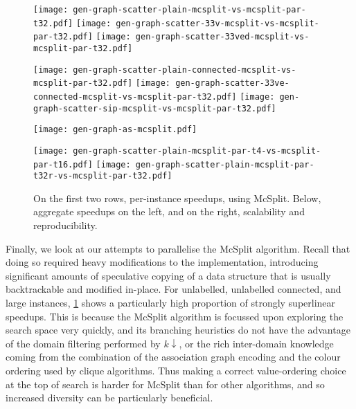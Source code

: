 \documentclass{llncs}
\begin{document}
\begin{figure}[p]
    \texttt{[image: gen-graph-scatter-plain-mcsplit-vs-mcsplit-par-t32.pdf]}
    \hfill
    \texttt{[image: gen-graph-scatter-33v-mcsplit-vs-mcsplit-par-t32.pdf]}
    \hfill
    \texttt{[image: gen-graph-scatter-33ved-mcsplit-vs-mcsplit-par-t32.pdf]}

    \vspace*{0.2em}

    \texttt{[image: gen-graph-scatter-plain-connected-mcsplit-vs-mcsplit-par-t32.pdf]}
    \hfill
    \texttt{[image: gen-graph-scatter-33ve-connected-mcsplit-vs-mcsplit-par-t32.pdf]}
    \hfill
    \texttt{[image: gen-graph-scatter-sip-mcsplit-vs-mcsplit-par-t32.pdf]}

    \vspace*{2em}

    \begin{minipage}[c]{0.62\textwidth}
    \texttt{[image: gen-graph-as-mcsplit.pdf]}
    \end{minipage}
    \hfill
    \begin{minipage}[t]{0.35\textwidth}
    \texttt{[image: gen-graph-scatter-plain-mcsplit-par-t4-vs-mcsplit-par-t16.pdf]}
    \vspace*{0.2em}
    \texttt{[image: gen-graph-scatter-plain-mcsplit-par-t32r-vs-mcsplit-par-t32.pdf]}
    \end{minipage}

    \caption{On the first two rows, per-instance speedups, using McSplit. Below, aggregate speedups
    on the left, and on the right, scalability and reproducibility.}\label{figure:mcsplitscatter}
\end{figure}

Finally, we look at our attempts to parallelise the McSplit algorithm. Recall that doing so required
heavy modifications to the implementation, introducing significant amounts of speculative copying of a
data structure that is usually backtrackable and modified in-place. For unlabelled, unlabelled
connected, and large instances, \cref{figure:mcsplitscatter} shows a particularly high proportion of
strongly superlinear speedups. This is because the McSplit algorithm is focussed upon
exploring the search space very quickly, and its branching heuristics do not have the advantage of
the domain filtering performed by $k{\downarrow}$, or the rich inter-domain knowledge coming from
the combination of the association graph encoding and the colour ordering used by clique algorithms.
Thus making a correct value-ordering choice at the top of search is harder for McSplit than for
other algorithms, and so increased diversity can be particularly beneficial.
\end{document}
